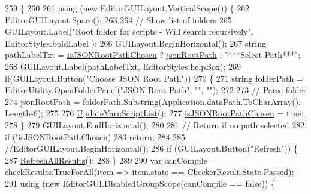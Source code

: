 \begin{DoxyCode}
259                      \{
260 
261             \textcolor{keyword}{using} (\textcolor{keyword}{new} EditorGUILayout.VerticalScope()) \{
262                 EditorGUILayout.Space();
263 
264                 \textcolor{comment}{// Show list of folders}
265                 GUILayout.Label(\textcolor{stringliteral}{"Root folder for scripts - Will search recursively"}, EditorStyles.boldLabel
      );
266                 GUILayout.BeginHorizontal();
267                 \textcolor{keywordtype}{string} pathLabelTxt = \hyperlink{a00188_a85f1c10b20b04052269b0ee2fb71c5af}{isJSONRootPathChosen} ? 
      \hyperlink{a00188_a7599a00e246791ee46a5c549a05975f3}{jsonRootPath} : \textcolor{stringliteral}{"***Select Path***"};
268                 GUILayout.Label(pathLabelTxt, EditorStyles.helpBox);
269                 \textcolor{keywordflow}{if}(GUILayout.Button(\textcolor{stringliteral}{"Choose JSON Root Path"}))
270                 \{
271                     \textcolor{keywordtype}{string} folderPath = EditorUtility.OpenFolderPanel(\textcolor{stringliteral}{"JSON Root Path"}, \textcolor{stringliteral}{""}, \textcolor{stringliteral}{""});
272 
273                     \textcolor{comment}{// Parse folder}
274                     \hyperlink{a00188_a7599a00e246791ee46a5c549a05975f3}{jsonRootPath} = folderPath.Substring(Application.dataPath.ToCharArray().
      Length-6);                    
275                     
276                     \hyperlink{a00188_a406febf62d77eaabc235f6316e537345}{UpdateYarnScriptList}();
277                     \hyperlink{a00188_a85f1c10b20b04052269b0ee2fb71c5af}{isJSONRootPathChosen} = \textcolor{keyword}{true};                    
278                 \}
279                 GUILayout.EndHorizontal();
280 
281                 \textcolor{comment}{// Return if no path selected}
282                 \textcolor{keywordflow}{if} (!\hyperlink{a00188_a85f1c10b20b04052269b0ee2fb71c5af}{isJSONRootPathChosen})
283                     \textcolor{keywordflow}{return};
284 
285                 \textcolor{comment}{//EditorGUILayout.BeginHorizontal();}
286                 \textcolor{keywordflow}{if} (GUILayout.Button(\textcolor{stringliteral}{"Refresh"})) \{
287                     \hyperlink{a00188_ae4faac1a6b0cc9710b20267dc4b88995}{RefreshAllResults}();
288                 \}
289 
290                 var canCompile = checkResults.TrueForAll(item => item.state == CheckerResult.State.Passed);
291                 \textcolor{keyword}{using} (\textcolor{keyword}{new} EditorGUI.DisabledGroupScope(canCompile == \textcolor{keyword}{false})) \{

\end{DoxyCode}
